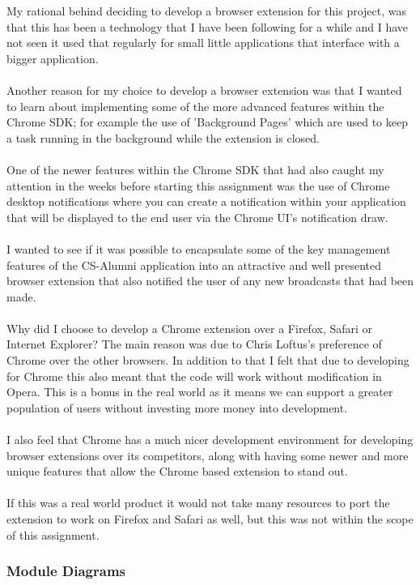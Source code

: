 \documentclass{article}
\begin{document}
My rational behind deciding to develop a browser extension for this project, was that this has been a technology that I have been following for a while and I have not seen it used that regularly for small little applications that interface with a bigger application.\\
\\
Another reason for my choice to develop a browser extension was that I wanted to learn about implementing some of the more advanced features within the Chrome SDK; for example the use of 'Background Pages' which are used to keep a task running in the background while the extension is closed.\\
\\
One of the newer features within the Chrome SDK that had also caught my attention in the weeks before starting this assignment was the use of Chrome desktop notifications where you can create a notification within your application that will be displayed to the end user via the Chrome UI's notification draw.\\
\\
I wanted to see if it was possible to encapsulate some of the key management features of the CS-Alumni application into an attractive and well presented browser extension that also notified the user of any new broadcasts that had been made.\\
\\
Why did I choose to develop a Chrome extension over a Firefox, Safari or Internet Explorer? The main reason was due to Chris Loftus's preference of Chrome over the other browsers. In addition to that I felt that due to developing for Chrome this also meant that the code will work without modification in Opera. This is a bonus in the real world as it means we can support a greater population of users without investing more money into development.\\
\\
I also feel that Chrome has a much nicer development environment for developing browser extensions over its competitors, along with having some newer and more unique features that allow the Chrome based extension to stand out.\\
\\
If this was a real world product it would not take many resources to port the extension to work on Firefox and Safari as well, but this was not within the scope of this assignment.

\newpage
\subsubsection{Module Diagrams}
\end{document}
